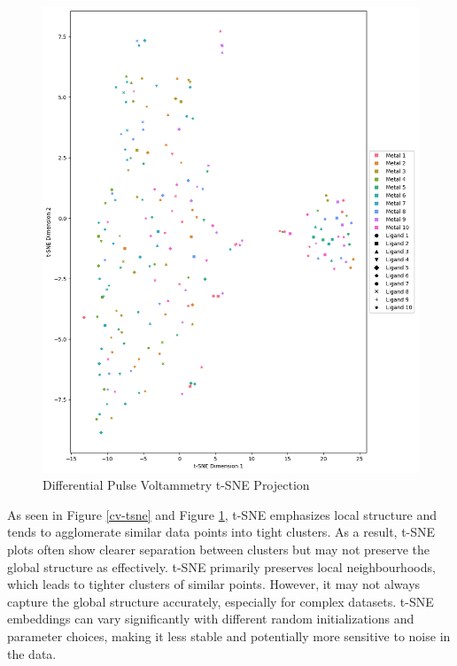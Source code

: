 \begin{figure}[!h]
  \centering
    \includegraphics[width=1.0\textwidth]{figures/dpv_tsne.png}
    \caption{Differential Pulse Voltammetry t-SNE Projection}
    \label{dpv-tsne}
\end{figure}
As seen in Figure \ref{cv-tsne} and Figure \ref{dpv-tsne}, t-SNE emphasizes local structure and tends to agglomerate similar data points into tight clusters. As a result, t-SNE plots often show clearer separation between clusters but may not preserve the global structure as effectively. t-SNE primarily preserves local neighbourhoods, which leads to tighter clusters of similar points. However, it may not always capture the global structure accurately, especially for complex datasets. t-SNE embeddings can vary significantly with different random initializations and parameter choices, making it less stable and potentially more sensitive to noise in the data. 

